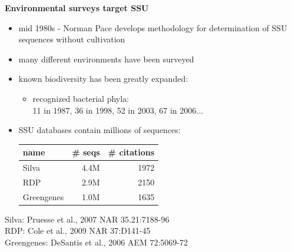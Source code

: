 \documentclass[landscape]{slides}
\begin{document}
\begin{slide}
\begin{center}

\textbf{Environmental surveys target SSU}
\end{center}
\medskip
\begin{minipage}{7in}
\small
\begin{itemize}
\item mid 1980s - Norman Pace develops methodology for determination
      of SSU sequences without cultivation
\item many different environments have been surveyed
\item known biodiversity has been greatly expanded:

\begin{itemize}
\item
  recognized bacterial phyla: \\
  11 in 1987, 36 in 1998, 52 in 2003, 67 in 2006...
\end{itemize}

\item SSU databases contain millions of sequences:
\begin{center}
\begin{tabular}{lrr}
  name & \# seqs & \# citations \\ \hline
  Silva & 4.4M & 1972 \\ 
  RDP   & 2.9M & 2150 \\
  Greengenes & 1.0M & 1635 \\
\end{tabular}
\end{center}
\end{itemize}

\tiny
Silva: Pruesse et al., 2007 NAR 35.21:7188-96 \\
RDP: Cole et al., 2009 NAR 37:D141-45 \\
Greengenes: DeSantis et al., 2006 AEM 72:5069-72 \\


\end{minipage}
\end{slide}
\end{document}
